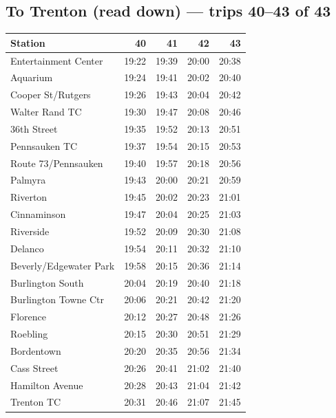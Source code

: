 \subsection*{To Trenton (read down) --- trips 40--43 of 43}
\begin{center}\footnotesize\setlength{\tabcolsep}{3pt}\begin{tabular}{@{}lrrrr@{}}\toprule
Station & 40 & 41 & 42 & 43 \\\midrule
Entertainment Center & 19:22 & 19:39 & 20:00 & 20:38 \\
Aquarium & 19:24 & 19:41 & 20:02 & 20:40 \\
Cooper St/Rutgers & 19:26 & 19:43 & 20:04 & 20:42 \\
Walter Rand TC & 19:30 & 19:47 & 20:08 & 20:46 \\
36th Street & 19:35 & 19:52 & 20:13 & 20:51 \\
Pennsauken TC & 19:37 & 19:54 & 20:15 & 20:53 \\
Route 73/Pennsauken & 19:40 & 19:57 & 20:18 & 20:56 \\
Palmyra & 19:43 & 20:00 & 20:21 & 20:59 \\
Riverton & 19:45 & 20:02 & 20:23 & 21:01 \\
Cinnaminson & 19:47 & 20:04 & 20:25 & 21:03 \\
Riverside & 19:52 & 20:09 & 20:30 & 21:08 \\
Delanco & 19:54 & 20:11 & 20:32 & 21:10 \\
Beverly/Edgewater Park & 19:58 & 20:15 & 20:36 & 21:14 \\
Burlington South & 20:04 & 20:19 & 20:40 & 21:18 \\
Burlington Towne Ctr & 20:06 & 20:21 & 20:42 & 21:20 \\
Florence & 20:12 & 20:27 & 20:48 & 21:26 \\
Roebling & 20:15 & 20:30 & 20:51 & 21:29 \\
Bordentown & 20:20 & 20:35 & 20:56 & 21:34 \\
Cass Street & 20:26 & 20:41 & 21:02 & 21:40 \\
Hamilton Avenue & 20:28 & 20:43 & 21:04 & 21:42 \\
Trenton TC & 20:31 & 20:46 & 21:07 & 21:45 \\
\bottomrule\end{tabular}\end{center}
